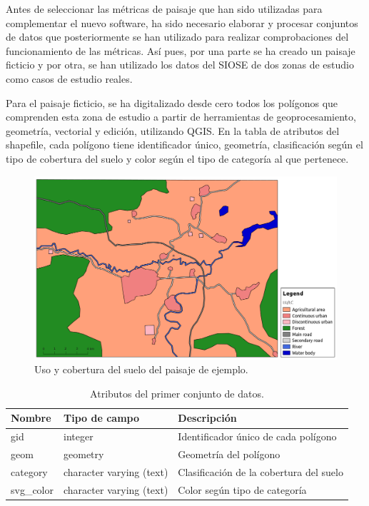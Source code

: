 Antes de seleccionar las métricas de paisaje que han sido utilizadas para complementar el nuevo software, ha sido necesario elaborar y procesar conjuntos de datos que posteriormente se han utilizado para realizar comprobaciones del funcionamiento de las métricas. Así pues, por una parte se ha creado un paisaje ficticio y por otra, se han utilizado los datos del SIOSE de dos zonas de estudio como casos de estudio reales.

Para el paisaje ficticio, se ha digitalizado desde cero todos los polígonos que comprenden esta zona de estudio a partir de herramientas de geoprocesamiento, geometría, vectorial y edición, utilizando QGIS. En la tabla de atributos del shapefile, cada polígono tiene identificador único, geometría, clasificación según el tipo de cobertura del suelo y color según el tipo de categoría al que pertenece.

\begin{figure}
\begin{center}
\includegraphics[width=\textwidth]{Metodologia/Figs/land_test.png}
\caption{Uso y cobertura del suelo del paisaje de ejemplo. \label{fig:lan_test}}
\end{center}
\end{figure}

\begin{table}[]
\centering
\caption{Atributos del primer conjunto de datos.}
\label{my-label}
\begin{tabular}{@{}lll@{}}
\toprule
\textbf{Nombre} & \textbf{Tipo de campo}   & \textbf{Descripción}                    \\ \midrule
gid             & integer                  & Identificador único de cada polígono    \\
geom            & geometry                 & Geometría del polígono                  \\
category        & character varying (text) & Clasificación de la cobertura del suelo \\
svg\_color      & character varying (text) & Color según tipo de categoría           \\ \bottomrule
\end{tabular}
\end{table}

